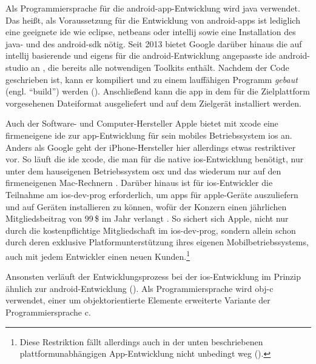 Als Programmiersprache für die \gls{android}-\gls{app}-Entwicklung wird \gls{java} verwendet. Das heißt, als Voraussetzung für die Entwicklung von \gls{android}-\glspl{app} ist lediglich eine geeignete \gls{ide} wie \gls{eclipse}, \gls{netbeans} oder \gls{intellij} sowie eine Installation des \gls{java}- und des \gls{android}-\gls{sdk} nötig. 
Seit 2013 bietet Google darüber hinaus die auf \gls{intellij} basierende und eigens für die \gls{android}-Entwicklung angepasste \gls{ide} \gls{android-studio} an \cite{android-studio}, die bereits alle notwendigen Toolkits enthält. 
Nachdem der Code geschrieben ist, kann er kompiliert und zu einem lauffähigen Programm \emph{gebaut} (engl. \enquote{build}) %
 werden (). Anschließend kann die \gls{app} in dem für die Zielplattform vorgesehenen Dateiformat ausgeliefert und auf dem Zielgerät installiert werden.

Auch der Software- und Computer-Hersteller Apple bietet mit \gls{xcode} eine firmeneigene \gls{ide} zur \gls{app}-Entwicklung für sein mobiles Betriebssystem \gls{ios} an. 
Anders als Google geht der iPhone-Hersteller hier allerdings etwas restriktiver vor. 
So läuft die \gls{ide} \gls{xcode}, die man für die native \gls{ios}-Entwicklung benötigt, nur unter dem hauseigenen Betriebssystem \gls{osx} und das wiederum nur auf den firmeneigenen Mac-Rechnern \cite{Cordova_Documentation_iOS_Platform_Guide}.
Darüber hinaus ist für \gls{ios}-Entwickler die Teilnahme am \gls{ios-dev-prog} erforderlich, um \glspl{app} für \gls{apple}-Geräte auszuliefern und auf Geräten installieren zu können, wofür der Konzern einen jährlichen Mitgliedsbeitrag von 99\,\$ im Jahr verlangt \cite{iOS_Developer_Program}.
So sichert sich Apple, nicht nur durch die kostenpflichtige Mitgliedschaft im \gls{ios-dev-prog}, sondern allein schon durch deren exklusive Platformunterstützung ihres eigenen Mobilbetriebssystems, auch mit jedem Entwickler einen neuen Kunden.\footnote{Diese Restriktion fällt allerdings auch in der unten beschriebenen plattformunabhängigen App-Entwicklung nicht unbedingt weg ().} 

Ansonsten verläuft der Entwicklungsprozess bei der \gls{ios}-Entwicklung im Prinzip ähnlich zur \gls{android}-Entwicklung ().
Als Programmiersprache wird \gls{obj-c} verwendet, einer um objektorientierte Elemente erweiterte Variante der Programmiersprache \gls{c}.

